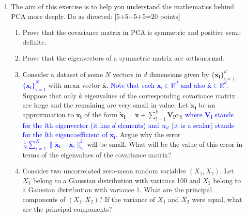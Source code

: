 \documentclass[11pt]{article}
\begin{document}
\begin{enumerate}
\item The aim of this exercise is to help you understand the mathematics behind PCA more deeply. Do as directed: \textsf{[5+5+5+5=20 points]}
\begin{enumerate}
\item Prove that the covariance matrix in PCA is symmetric and positive semi-definite.
\item Prove that the eigenvectors of a symmetric matrix are orthonormal.
\item Consider a dataset of some $N$ vectors in $d$ dimensions given by \st{$\{\boldsymbol{x_i}\}_{i=1}^d$} \textcolor{blue}{$\{\boldsymbol{x_i}\}_{i=1}^N$} with mean vector $\boldsymbol{\bar{x}}$. \textcolor{blue}{Note that each $\boldsymbol{x_i} \in \mathbb{R}^d$ and also $\boldsymbol{\bar{x}} \in \mathbb{R}^d$.} 
Suppose that only $k$ eigenvalues of the corresponding covariance matrix are large and the remaining are very small in value. Let $\boldsymbol{\tilde{x}_i}$ be an approximation to $\boldsymbol{x_i}$ of the form $\boldsymbol{\tilde{x}_i} = \boldsymbol{\bar{x}} + \sum_{l=1}^k \boldsymbol{V_l} \alpha_{il}$ \textcolor{blue}{where $\boldsymbol{V_l}$ stands for the $l$th eigenvector (it has $d$ elements) and $\alpha_{il}$ (it is a scalar) stands for the $l$th eigencoefficient of $\boldsymbol{x_i}$.} Argue why the error \textcolor{blue}{$\frac{1}{N} \sum_{i=1}^N \|\boldsymbol{\tilde{x}_i} - \boldsymbol{x_i}\|^2_2$} will be small. What will be the value of this error in terms of the eigenvalues of the covariance matrix?   
\item Consider two uncorrelated zero-mean random variables $(X_1, X_2)$. Let $X_1$ belong to a Gaussian distribution with variance 100 and $X_2$ belong to a Gaussian distribution with variance 1. What are the principal components of $(X_1, X_2)$? If the variance of $X_1$ and $X_2$ were equal, what are the principal components? 
\end{enumerate}


\end{enumerate}
\end{document}
